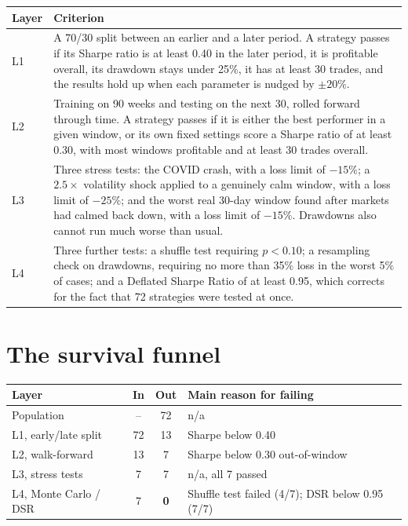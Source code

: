 \documentclass[11pt]{article}
\begin{document}
\begin{table}[h]
\small
\begin{tabular}{@{}p{1.1cm}p{12.3cm}@{}}
\toprule
\textbf{Layer} & \textbf{Criterion} \\
\midrule
L1 & A 70/30 split between an earlier and a later period. A strategy passes if its Sharpe ratio is at least 0.40 in
the later period, it is profitable overall, its drawdown stays under 25\%, it has at least 30 trades, and the
results hold up when each parameter is nudged by $\pm20\%$. \\
L2 & Training on 90 weeks and testing on the next 30, rolled forward through time. A strategy passes if it is
either the best performer in a given window, or its own fixed settings score a Sharpe ratio of at least 0.30, with
most windows profitable and at least 30 trades overall. \\
L3 & Three stress tests: the COVID crash, with a loss limit of $-15\%$; a $2.5\times$ volatility shock applied to a
genuinely calm window, with a loss limit of $-25\%$; and the worst real 30-day window found after markets had calmed
back down, with a loss limit of $-15\%$. Drawdowns also cannot run much worse than usual. \\
L4 & Three further tests: a shuffle test requiring $p<0.10$; a resampling check on drawdowns, requiring no more than
35\% loss in the worst 5\% of cases; and a Deflated Sharpe Ratio of at least 0.95, which corrects for the fact that
72 strategies were tested at once. \\
\bottomrule
\end{tabular}
\end{table}

\section{The survival funnel}
\begin{table}[h]
\centering\small
\begin{tabular}{lccl}
\toprule
Layer & In & Out & Main reason for failing \\
\midrule
Population & -- & 72 & n/a \\
L1, early/late split & 72 & 13 & Sharpe below 0.40 \\
L2, walk-forward & 13 & 7 & Sharpe below 0.30 out-of-window \\
L3, stress tests & 7 & 7 & n/a, all 7 passed \\
L4, Monte Carlo / DSR & 7 & \textbf{0} & Shuffle test failed (4/7); DSR below 0.95 (7/7) \\
\bottomrule
\end{tabular}
\end{table}
\end{document}

